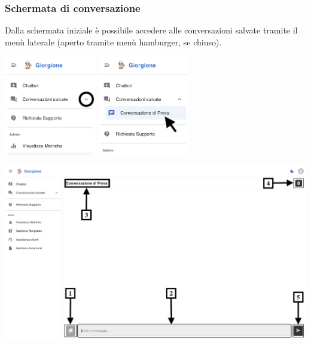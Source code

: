 \subsubsection{Schermata di conversazione}
Dalla schermata iniziale è possibile accedere alle conversazioni salvate tramite il menù laterale (aperto tramite menù hamburger, se chiuso).
\begin{center}
    \includegraphics[width=0.3\textwidth]{./img/laterale1.png}
    \hspace{0.05\textwidth}
    \includegraphics[width=0.3\textwidth]{./img/laterale2.png}
\end{center}

\begin{center}
    \includegraphics[width=\textwidth]{./img/SchermataChat1.png}
    \label{fig:schermata-chat}
\end{center}

